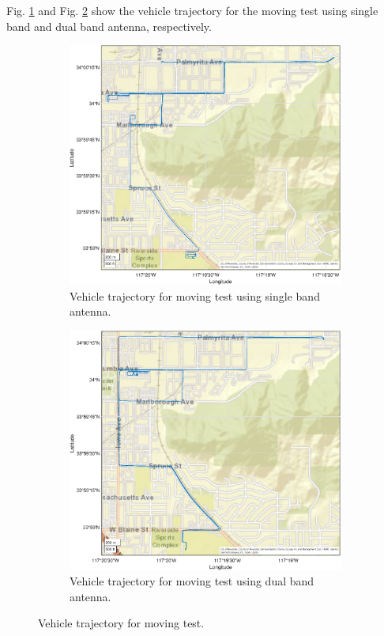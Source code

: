 \documentclass[letterpaper, 10 pt,onecolumn]{article}
\begin{document}
	Fig. \ref{fig:trj_mt1} and Fig. \ref{fig:trj_mt2} show the vehicle trajectory for the moving test using single band and dual band antenna, respectively.
	\begin{figure}[H]
		\centering
		\begin{subfigure}{.5\textwidth}
			\includegraphics[width=\linewidth]{figures/trajectory_single.eps}
			\caption{Vehicle trajectory for moving test using single band antenna.}
			\label{fig:trj_mt1}
		\end{subfigure}%
		\begin{subfigure}{.5\textwidth}
			\includegraphics[width=\linewidth]{figures/trajectory_dual.eps}
			\caption{Vehicle trajectory for moving test using dual band antenna.}
			\label{fig:trj_mt2}
		\end{subfigure}
		\caption[short]{Vehicle trajectory for moving test.}
		\label{fig:trj}
	\end{figure}
	
\end{document}
